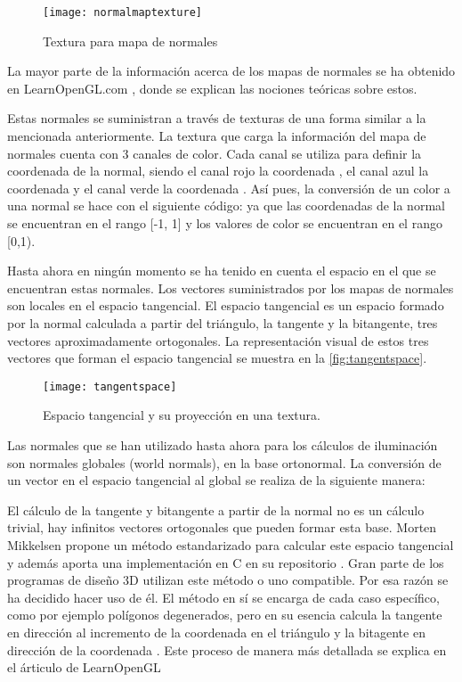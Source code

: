 \begin{figure}[H]
    \centering
	\texttt{[image: normalmaptexture]}
	\caption{Textura para mapa de normales}
	\label{fig:normalmaptexture}
\end{figure}


	
La mayor parte de la información acerca de los mapas de normales se ha obtenido en LearnOpenGL.com \cite{learnopengl}, donde se explican las nociones teóricas sobre estos.
	
Estas normales se suministran a través de texturas de una forma similar a la mencionada anteriormente. La textura que carga la información del mapa de normales cuenta con 3 canales de color. Cada canal se utiliza para definir la coordenada de la normal, siendo el canal rojo la coordenada , el canal azul la coordenada  y el canal verde la coordenada . Así pues, la conversión de un color a una normal se hace con el siguiente código:  ya que las coordenadas de la normal se encuentran en el rango [-1, 1] y los valores de color se encuentran en el rango [0,1).
	
Hasta ahora en ningún momento se ha tenido en cuenta el espacio en el que se encuentran estas normales. Los vectores suministrados por los mapas de normales son locales en el espacio tangencial. El espacio tangencial es un espacio formado por la normal calculada a partir del triángulo, la tangente y la bitangente, tres vectores aproximadamente ortogonales. La representación visual de estos tres vectores que forman el espacio tangencial se muestra en la \autoref{fig:tangentspace}.

\begin{figure}[H]
    \centering
	\texttt{[image: tangentspace]}
	\caption{Espacio tangencial y su proyección en una textura.}
	\label{fig:tangentspace}
\end{figure}
	
Las normales que se han utilizado hasta ahora para los cálculos de iluminación son normales globales (world normals), en la base ortonormal. La conversión de un vector en el espacio tangencial al global se realiza de la siguiente manera: 
	
El cálculo de la tangente y bitangente a partir de la normal no es un cálculo trivial, hay infinitos vectores ortogonales que pueden formar esta base. Morten Mikkelsen \cite{mikkelsen2008simulation} propone un método estandarizado para calcular este espacio tangencial y además aporta una implementación en C en su repositorio \cite{mikktspace}. Gran parte de los programas de diseño 3D utilizan este método o uno compatible. Por esa razón se ha decidido hacer uso de él. El método en sí se encarga de cada caso específico, como por ejemplo polígonos degenerados, pero en su esencia calcula la tangente en dirección al incremento de la coordenada  en el triángulo y la bitagente en dirección de la coordenada . Este proceso de manera más detallada se explica en el árticulo de LearnOpenGL \cite{learnopengl}

